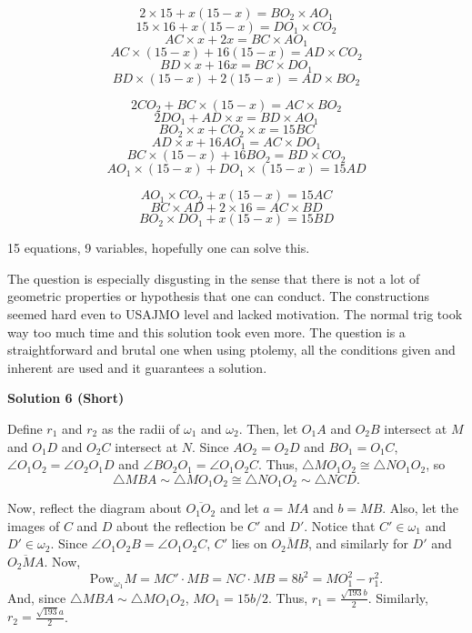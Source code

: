 \begin{enumerate}
 
 \[2\times 15 + x(15-x) = BO_2\times AO_1\]
 \[15\times 16 + x(15-x) = DO_1\times CO_2\]
 \[AC\times x + 2x = BC\times AO_1\]
 \[AC\times (15-x) + 16(15-x) = AD\times CO_2\]
 \[BD\times x + 16x = BC\times DO_1\]
 \[BD\times (15-x) + 2(15-x) = AD\times BO_2\]

 \[2CO_2 + BC\times (15-x) = AC\times BO_2\]
 \[2DO_1 + AD\times x = BD\times AO_1\]
 \[BO_2\times x + CO_2\times x = 15BC\]
 \[AD\times x + 16AO_1 = AC\times DO_1\]
 \[BC\times (15-x) + 16BO_2 = BD\times CO_2\]
 \[AO_1\times (15-x) + DO_1\times (15-x) = 15AD\]

 \[AO_1\times CO_2 + x(15-x) = 15AC\]
 \[BC\times AD + 2\times 16 = AC\times BD\]
 \[BO_2\times DO_1 + x(15-x) = 15BD\]

 15 equations, 9 variables, hopefully one can solve this. 

 The question is especially disgusting in the sense that there is not a lot of geometric properties or hypothesis that one can conduct. The constructions seemed hard even to USAJMO level and lacked motivation. The normal trig took way too much time and this solution took even more. The question is a straightforward and brutal one when using ptolemy, all the conditions given and inherent are used and it guarantees a solution.

 


 



\textbf{Solution 6 (Short)}

Define $r_1$ and $r_2$ as the radii of $\omega_1$ and $\omega_2$. Then, let $O_1A$ and $O_2B$ intersect at $M$ and $O_1D$ and $O_2C$ intersect at $N$. Since $AO_2 = O_2D$ and $BO_1 = O_1C$, $\angle O_1O_2=\angle O_2O_1D$ and $\angle BO_2O_1=\angle O_1O_2C$. Thus, $\triangle MO_1O_2\cong\triangle NO_1O_2$, so 
 \[\triangle MBA \sim \triangle MO_1O_2 \cong \triangle NO_1O_2 \sim \triangle NCD.\]

 Now, reflect the diagram about $\overline{O_1O_2}$ and let $a=MA$ and $b=MB$. Also, let the images of $C$ and $D$ about the reflection be $C'$ and $D'$. Notice that $C'\in\omega_1$ and $D'\in\omega_2$. Since $\angle O_1O_2B=\angle O_1O_2C$, $C'$ lies on $\overline{O_2MB}$, and similarly for $D'$ and $\overline{O_2MA}$. Now, 
 \[\text{Pow}_{\omega_1}M=MC'\cdot MB = NC\cdot MB = 8b^2=MO_1^2 - r_1^2.\] And, since $\triangle MBA \sim \triangle MO_1O_2$, $MO_1 = 15b/2$. Thus, $r_1 = \frac{\sqrt{193}b}{2}$. Similarly, $r_2 = \frac{\sqrt{193}a}{2}$. 


\end{enumerate}
